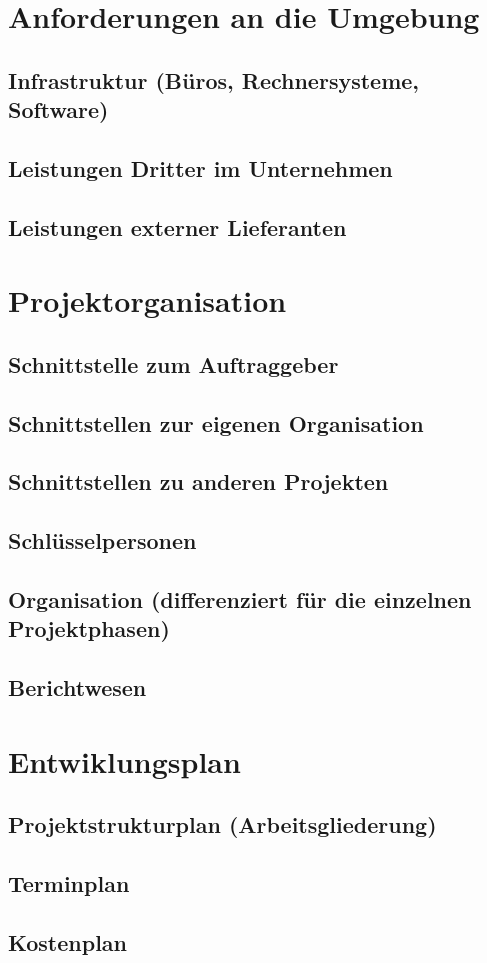 \documentclass[a4paper,10pt]{scrartcl}
\begin{document}
\section{Anforderungen an die Umgebung}
\subsection{Infrastruktur (Büros, Rechnersysteme, Software)}
\subsection{Leistungen Dritter im Unternehmen}
\subsection{Leistungen externer Lieferanten}




\section{Projektorganisation}
\subsection{Schnittstelle zum Auftraggeber}
\subsection{Schnittstellen zur eigenen Organisation}
\subsection{Schnittstellen zu anderen Projekten}
\subsection{Schlüsselpersonen}
\subsection{Organisation (differenziert für die einzelnen Projektphasen)}
\subsection{Berichtwesen}


\section{Entwiklungsplan}
\subsection{Projektstrukturplan (Arbeitsgliederung)}
\subsection{Terminplan}
\subsection{Kostenplan}
\end{document}
